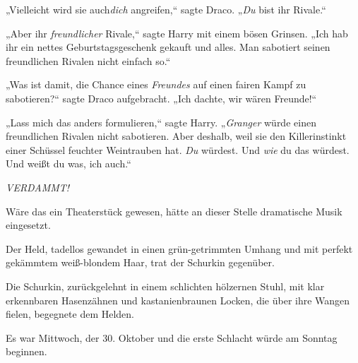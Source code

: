 „Vielleicht wird sie auch\emph{dich} angreifen,“ sagte Draco. „\emph{Du} bist ihr Rivale.“

„Aber ihr \emph{freundlicher} Rivale,“ sagte Harry mit einem bösen Grinsen. „Ich hab ihr ein nettes Geburtstagsgeschenk gekauft und alles. Man sabotiert seinen freundlichen Rivalen nicht einfach so.“

„Was ist damit, die Chance eines \emph{Freundes} auf einen fairen Kampf zu sabotieren?“ sagte Draco aufgebracht. „Ich dachte, wir wären Freunde!“

„Lass mich das anders formulieren,“ sagte Harry. „\emph{Granger} würde einen freundlichen Rivalen nicht sabotieren. Aber deshalb, weil sie den Killerinstinkt einer Schüssel feuchter Weintrauben hat. \emph{Du} würdest. Und \emph{wie} du das würdest. Und weißt du was, ich auch.“

\emph{VERDAMMT!}

\later

Wäre das ein Theaterstück gewesen, hätte an dieser Stelle dramatische Musik eingesetzt.

Der Held, tadellos gewandet in einen grün-getrimmten Umhang und mit perfekt gekämmtem weiß-blondem Haar, trat der Schurkin gegenüber.

Die Schurkin, zurückgelehnt in einem schlichten hölzernen Stuhl, mit klar erkennbaren Hasenzähnen und kastanienbraunen Locken, die über ihre Wangen fielen, begegnete dem Helden.

Es war Mittwoch, der 30. Oktober und die erste Schlacht würde am Sonntag beginnen.

